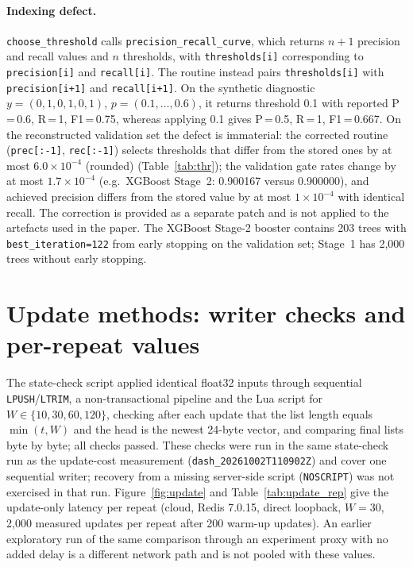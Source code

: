 \documentclass[10pt,a4paper]{article}
\begin{document}
\paragraph{Indexing defect.} \texttt{choose\_threshold} calls \texttt{precision\_recall\_curve}, which returns $n+1$ precision and recall values and $n$ thresholds, with \texttt{thresholds[i]} corresponding to \texttt{precision[i]} and \texttt{recall[i]}. The routine instead pairs \texttt{thresholds[i]} with \texttt{precision[i+1]} and \texttt{recall[i+1]}. On the synthetic diagnostic $y=(0,1,0,1,0,1)$, $p=(0.1,\dots,0.6)$, it returns threshold 0.1 with reported P\,=\,0.6, R\,=\,1, F1\,=\,0.75, whereas applying 0.1 gives P\,=\,0.5, R\,=\,1, F1\,=\,0.667. On the reconstructed validation set the defect is immaterial: the corrected routine (\texttt{prec[:-1]}, \texttt{rec[:-1]}) selects thresholds that differ from the stored ones by at most $6.0\times10^{-4}$ (rounded) (Table~\ref{tab:thr}); the validation gate rates change by at most $1.7\times10^{-4}$ (e.g.\ XGBoost Stage~2: 0.900167 versus 0.900000), and achieved precision differs from the stored value by at most $1\times10^{-4}$ with identical recall. The correction is provided as a separate patch and is not applied to the artefacts used in the paper. The XGBoost Stage-2 booster contains 203 trees with \texttt{best\_iteration=122} from early stopping on the validation set; Stage~1 has 2,000 trees without early stopping.

\section{Update methods: writer checks and per-repeat values}
\label{sec:update}
The state-check script applied identical float32 inputs through sequential \texttt{LPUSH}/\texttt{LTRIM}, a non-transactional pipeline and the Lua script for $W\in\{10,30,60,120\}$, checking after each update that the list length equals $\min(t,W)$ and the head is the newest 24-byte vector, and comparing final lists byte by byte; all checks passed. These checks were run in the same state-check run as the update-cost measurement (\texttt{dash\_20261002T110902Z}) and cover one sequential writer; recovery from a missing server-side script (\texttt{NOSCRIPT}) was not exercised in that run. Figure~\ref{fig:update} and Table~\ref{tab:update_rep} give the update-only latency per repeat (cloud, Redis 7.0.15, direct loopback, $W=30$, 2,000 measured updates per repeat after 200 warm-up updates). An earlier exploratory run of the same comparison through an experiment proxy with no added delay is a different network path and is not pooled with these values.
\end{document}
